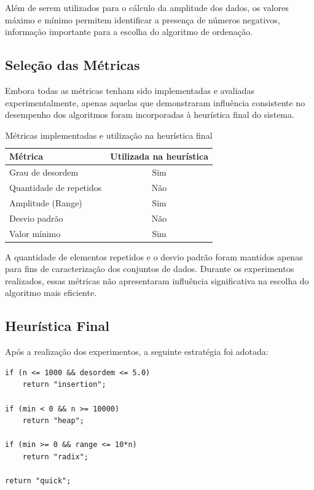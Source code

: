 \documentclass{article}
\begin{document}
Além de serem utilizados para o cálculo da amplitude dos dados, os valores máximo e mínimo permitem identificar a presença de números negativos, informação importante para a escolha do algoritmo de ordenação.

\subsection{Seleção das Métricas}

Embora todas as métricas tenham sido implementadas e avaliadas experimentalmente, apenas aquelas que demonstraram influência consistente no desempenho dos algoritmos foram incorporadas à heurística final do sistema.

\begin{table}[H]
\centering
\begin{tabular}{lc}
\toprule
\textbf{Métrica} & \textbf{Utilizada na heurística} \\
\midrule
Grau de desordem & Sim \\
Quantidade de repetidos & Não \\
Amplitude (Range) & Sim \\
Desvio padrão & Não \\
Valor mínimo & Sim \\
\bottomrule
\end{tabular}
\caption{Métricas implementadas e utilização na heurística final}
\end{table}

A quantidade de elementos repetidos e o desvio padrão foram mantidos apenas para fins de caracterização dos conjuntos de dados. Durante os experimentos realizados, essas métricas não apresentaram influência significativa na escolha do algoritmo mais eficiente.

\subsection{Heurística Final}

Após a realização dos experimentos, a seguinte estratégia foi adotada:

\begin{verbatim}
if (n <= 1000 && desordem <= 5.0)
    return "insertion";

if (min < 0 && n >= 10000)
    return "heap";

if (min >= 0 && range <= 10*n)
    return "radix";

return "quick";
\end{verbatim}
\end{document}
